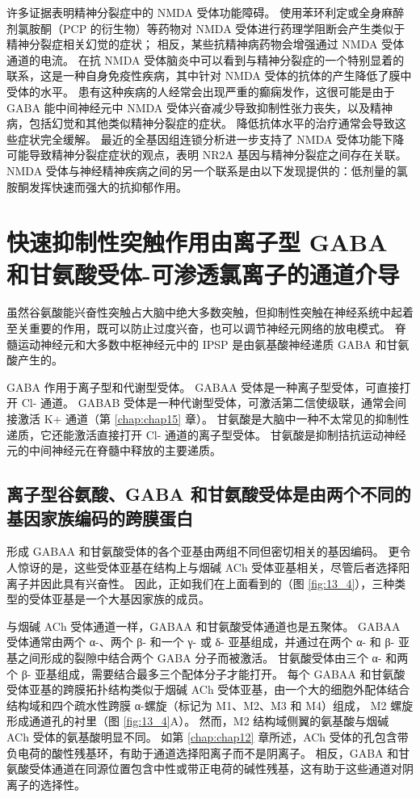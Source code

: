 许多证据表明精神分裂症中的 NMDA 受体功能障碍。 
使用苯环利定或全身麻醉剂氯胺酮（PCP 的衍生物）等药物对 NMDA 受体进行药理学阻断会产生类似于精神分裂症相关幻觉的症状； 
相反，某些抗精神病药物会增强通过 NMDA 受体通道的电流。 
在抗 NMDA 受体脑炎中可以看到与精神分裂症的一个特别显着的联系，这是一种自身免疫性疾病，其中针对 NMDA 受体的抗体的产生降低了膜中受体的水平。 
患有这种疾病的人经常会出现严重的癫痫发作，这很可能是由于 GABA 能中间神经元中 NMDA 受体兴奋减少导致抑制性张力丧失，以及精神病，包括幻觉和其他类似精神分裂症的症状。 
降低抗体水平的治疗通常会导致这些症状完全缓解。 
最近的全基因组连锁分析进一步支持了 NMDA 受体功能下降可能导致精神分裂症症状的观点，表明 NR2A 基因与精神分裂症之间存在关联。 
NMDA 受体与神经精神疾病之间的另一个联系是由以下发现提供的：低剂量的氯胺酮发挥快速而强大的抗抑郁作用。



\section{快速抑制性突触作用由离子型 GABA 和甘氨酸受体-可渗透氯离子的通道介导}

虽然谷氨酸能兴奋性突触占大脑中绝大多数突触，但抑制性突触在神经系统中起着至关重要的作用，既可以防止过度兴奋，也可以调节神经元网络的放电模式。
脊髓运动神经元和大多数中枢神经元中的 IPSP 是由氨基酸神经递质 GABA 和甘氨酸产生的。


GABA 作用于离子型和代谢型受体。 GABAA 受体是一种离子型受体，可直接打开 Cl- 通道。 
GABAB 受体是一种代谢型受体，可激活第二信使级联，通常会间接激活 K+ 通道（第 \ref{chap:chap15} 章）。 
甘氨酸是大脑中一种不太常见的抑制性递质，它还能激活直接打开 Cl- 通道的离子型受体。 
甘氨酸是抑制拮抗运动神经元的中间神经元在脊髓中释放的主要递质。


\subsection{离子型谷氨酸、GABA 和甘氨酸受体是由两个不同的基因家族编码的跨膜蛋白}
形成 GABAA 和甘氨酸受体的各个亚基由两组不同但密切相关的基因编码。 
更令人惊讶的是，这些受体亚基在结构上与烟碱 ACh 受体亚基相关，尽管后者选择阳离子并因此具有兴奋性。 
因此，正如我们在上面看到的（图 \ref{fig:13_4}），三种类型的受体亚基是一个大基因家族的成员。


与烟碱 ACh 受体通道一样，GABAA 和甘氨酸受体通道也是五聚体。
GABAA 受体通常由两个 α-、两个 β- 和一个 γ- 或 δ- 亚基组成，并通过在两个 α- 和 β- 亚基之间形成的裂隙中结合两个 GABA 分子而被激活。 甘氨酸受体由三个 α- 和两个 β- 亚基组成，需要结合最多三个配体分子才能打开。 
每个 GABAA 和甘氨酸受体亚基的跨膜拓扑结构类似于烟碱 ACh 受体亚基，由一个大的细胞外配体结合结构域和四个疏水性跨膜 α-螺旋（标记为 M1、M2、M3 和 M4）组成， M2 螺旋形成通道孔的衬里（图 \ref{fig:13_4}A）。 
然而，M2 结构域侧翼的氨基酸与烟碱 ACh 受体的氨基酸明显不同。 
如第 \ref{chap:chap12} 章所述，ACh 受体的孔包含带负电荷的酸性残基环，有助于通道选择阳离子而不是阴离子。 
相反，GABA 和甘氨酸受体通道在同源位置包含中性或带正电荷的碱性残基，这有助于这些通道对阴离子的选择性。


